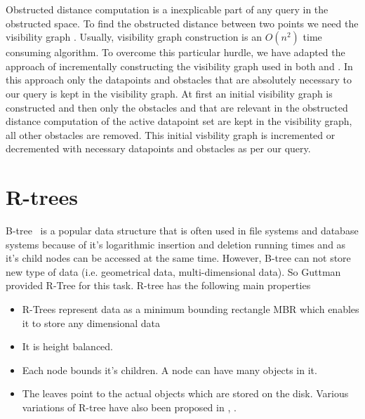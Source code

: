 Obstructed distance computation is a inexplicable part of any query in the obstructed space. To find the obstructed distance between two points we need the visibility graph \cite{ognn}. Usually, visibility graph construction is an $ O(n^2) $ time consuming algorithm. To overcome this particular hurdle, we have adapted the approach of incrementally constructing the visibility graph used in both \cite{ognn} and \cite{oknn}. In this approach only the datapoints and obstacles that are absolutely necessary to our query is kept in the visibility graph. At first an initial visibility graph is constructed and then only the obstacles and that are relevant in the obstructed distance computation of the active datapoint set are kept in the visibility graph, all other obstacles are removed. This initial visbility graph is incremented or decremented with necessary datapoints and obstacles as per our query. \\



\section{R-trees} 
\label{sec:R}
B-tree~\cite{BTREE} is a  popular data structure that is often used in file systems and database systems because of it's logarithmic insertion and deletion running times and as it's child nodes can be accessed at the same time. However, B-tree can not store new type of data (i.e. geometrical data, multi-dimensional data). So Guttman ~\cite{RT2} provided R-Tree for this task. R-tree has the following main properties
\begin{itemize}
\item  R-Trees represent data as a minimum bounding rectangle MBR which enables it to store any dimensional data
\item It is height balanced.
\item Each node bounds it's children. A node can have many objects in it.
\item The leaves point to the actual objects which are stored on the disk.
Various variations of R-tree have also been proposed in \cite{RT3}, \cite{RT4}.
\end{itemize}


\endinput 